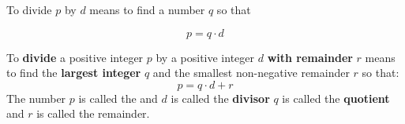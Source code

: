 \begin{frame}
\begin{definition}[Division]
To divide $p$ by $d$ means to find a number $q$ so that 

\[
p = q \cdot d 
\]
\end{definition}
\begin{definition}
To \textbf{divide} a positive integer $p$ by a positive integer $d$  \textbf{with remainder} $r$ means to find the \textbf{largest integer} $q$ and the smallest non-negative remainder $r$ so that:
\[
p = q\cdot d+ r
\]
The number $p$ is called the  and $d$ is called the \textbf{divisor} $q$ is called the \textbf{quotient} and $r$ is called the remainder.
\end{definition}

\end{frame}